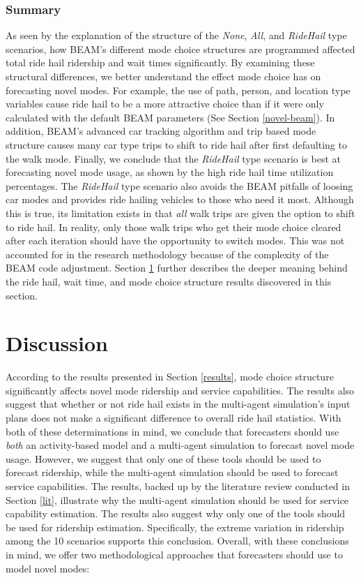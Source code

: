 \documentclass[12pt, oneside, openright]{byuthesis}
\begin{document}
\hypertarget{summary-2}{%
\subsection{Summary}\label{summary-2}}

As seen by the explanation of the structure of the \emph{None}, \emph{All}, and \emph{RideHail} type scenarios, how BEAM's different mode choice structures are programmed affected total ride hail ridership and wait times significantly. By examining these structural differences, we better understand the effect mode choice has on forecasting novel modes. For example, the use of path, person, and location type variables cause ride hail to be a more attractive choice than if it were only calculated with the default BEAM parameters (See Section \ref{novel-beam}). In addition, BEAM's advanced car tracking algorithm and trip based mode structure causes many car type trips to shift to ride hail after first defaulting to the walk mode. Finally, we conclude that the \emph{RideHail} type scenario is best at forecasting novel mode usage, as shown by the high ride hail time utilization percentages. The \emph{RideHail} type scenario also avoids the BEAM pitfalls of loosing car modes and provides ride hailing vehicles to those who need it most. Although this is true, its limitation exists in that \emph{all} walk trips are given the option to shift to ride hail. In reality, only those walk trips who get their mode choice cleared after each iteration should have the opportunity to switch modes. This was not accounted for in the research methodology because of the complexity of the BEAM code adjustment. Section \ref{discussion} further describes the deeper meaning behind the ride hail, wait time, and mode choice structure results discovered in this section.

\hypertarget{discussion}{%
\chapter{Discussion}\label{discussion}}

According to the results presented in Section \ref{results}, mode choice structure significantly affects novel mode ridership and service capabilities. The results also suggest that whether or not ride hail exists in the multi-agent simulation's input plans does not make a significant difference to overall ride hail statistics. With both of these determinations in mind, we conclude that forecasters should use \emph{both} an activity-based model and a multi-agent simulation to forecast novel mode usage. However, we suggest that only one of these tools should be used to forecast ridership, while the multi-agent simulation should be used to forecast service capabilities. The results, backed up by the literature review conducted in Section \ref{lit}, illustrate why the multi-agent simulation should be used for service capability estimation. The results also suggest why only one of the tools should be used for ridership estimation. Specifically, the extreme variation in ridership among the 10 scenarios supports this conclusion. Overall, with these conclusions in mind, we offer two methodological approaches that forecasters should use to model novel modes:
\end{document}
